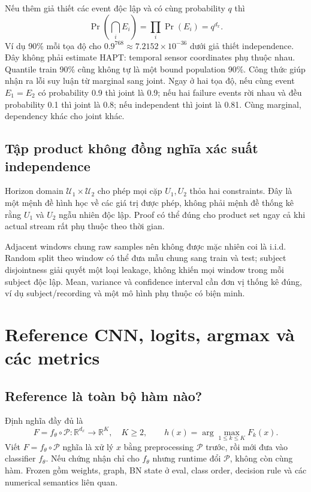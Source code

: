 \documentclass[11pt,a4paper]{article}
\newcommand{\R}{\mathbb R}
\newcommand{\Uset}{\mathcal U}
\theoremstyle{definition}
\begin{document}
Nếu thêm giả thiết các event độc lập và có cùng probability $q$ thì
\begin{equation}
\Pr\left(\bigcap_iE_i\right)=\prod_i\Pr(E_i)=q^{d_x}.
\end{equation}
Ví dụ 90\% mỗi tọa độ cho $0.9^{768}\approx7.2152\times10^{-36}$ dưới
giả thiết independence. Đây không phải estimate HAPT: temporal sensor
coordinates phụ thuộc nhau. Quantile train 90\% cũng không tự là một bound
population 90\%. Công thức giúp nhận ra lỗi suy luận từ marginal sang joint.
Ngay ở hai tọa độ, nếu cùng event $E_1=E_2$ có probability 0.9 thì joint
là 0.9; nếu hai failure events rời nhau và đều probability 0.1 thì joint
là 0.8; nếu independent thì joint là 0.81. Cùng marginal, dependency khác
cho joint khác.

\subsection{Tập product không đồng nghĩa xác suất independence}
Horizon domain $\Uset_1\times\Uset_2$ cho phép mọi cặp $U_1,U_2$ thỏa hai
constraints. Đây là một mệnh đề hình học về các giá trị được phép, không
phải mệnh đề thống kê rằng $U_1$ và $U_2$ ngẫu nhiên độc lập. Proof có thể
đúng cho product set ngay cả khi actual stream rất phụ thuộc theo thời gian.

Adjacent windows chung raw samples nên không được mặc nhiên coi là i.i.d.
Random split theo window có thể đưa mẫu chung sang train và test; subject
disjointness giải quyết một loại leakage, không khiến mọi window trong mỗi
subject độc lập. Mean, variance và confidence interval cần đơn vị thống kê
đúng, ví dụ subject/recording và một mô hình phụ thuộc có biện minh.

\section{Reference CNN, logits, argmax và các metrics}
\subsection{Reference là toàn bộ hàm nào?}
Định nghĩa đầy đủ là
\begin{equation}
F=f_\theta\circ\mathcal P:\R^{d_x}\to\R^K,\quad K\ge2,\qquad
h(x)=\arg\max_{1\le k\le K}F_k(x).
\end{equation}
Viết $F=f_\theta\circ\mathcal P$ nghĩa là xử lý $x$ bằng preprocessing
$\mathcal P$ trước, rồi mới đưa vào classifier $f_\theta$. Nếu chứng nhận
chỉ cho $f_\theta$ nhưng runtime đổi $\mathcal P$, không còn cùng hàm.
Frozen gồm weights, graph, BN state ở eval, class order, decision rule và
các numerical semantics liên quan.
\end{document}
